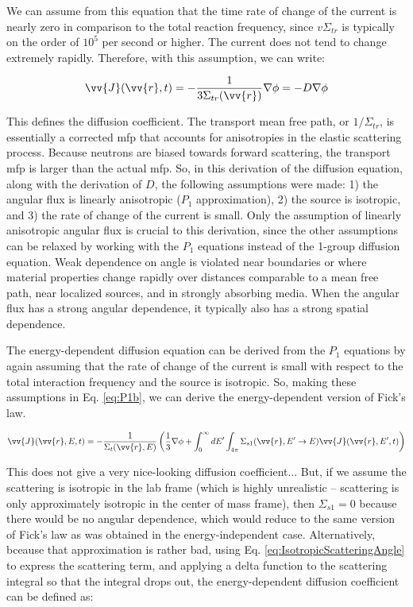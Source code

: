 \documentclass[10pt]{article}
\begin{document}
\begin{flushleft}
We can assume from this equation that the time rate of change of the current is nearly zero in comparison to the total reaction frequency, since \(v\Sigma_{tr}\) is typically on the order of \(10^5\) per second or higher. The current does not tend to change extremely rapidly. Therefore, with this assumption, we can write:

\begin{equation}
\label{eq:P1b_CurrentApproximation_2}
\vv{J}(\vv{r},t) =  - \frac{1}{3\Sigma_{tr}(\vv{r})}\nabla\phi = -D\nabla\phi
\end{equation}

This defines the diffusion coefficient. The transport mean free path, or \(1/\Sigma_{tr}\), is essentially a corrected mfp that accounts for anisotropies in the elastic scattering process.  Because neutrons are biased towards forward scattering, the transport mfp is larger than the actual mfp. So, in this derivation of the diffusion equation, along with the derivation of \(D\), the following assumptions were made: 1) the angular flux is linearly anisotropic (\(P_1\) approximation), 2) the source is isotropic, and 3) the rate of change of the current is small. Only the assumption of linearly anisotropic angular flux is crucial to this derivation, since the other assumptions can be relaxed by working with the \(P_1\) equations instead of the 1-group diffusion equation. Weak dependence on angle is violated near boundaries or where material properties change rapidly over distances comparable to a mean free path, near localized sources, and in strongly absorbing media. When the angular flux has a strong angular dependence, it typically also has a strong spatial dependence. 

The energy-dependent diffusion equation can be derived from the \(P_1\) equations by again assuming that the rate of change of the current is small with respect to the total interaction frequency and the source is isotropic. So, making these assumptions in Eq. \ref{eq:P1b}, we can derive the energy-dependent version of Fick's law. 

\begin{equation}
\label{eq:P1b_energyDepdendent}
\vv{J}(\vv{r}, E, t) = - \frac{1}{\Sigma_t(\vv{r},E)}\left(\frac{1}{3}\nabla\phi + \int_{0}^{\infty}dE' \int_{4\pi}^{ } \Sigma_{s1}(\vv{r}, E'\rightarrow E)\vv{J}(\vv{r}, E', t)\right)
\end{equation}

This does not give a very nice-looking diffusion coefficient... But, if we assume the scattering is isotropic in the lab frame (which is highly unrealistic – scattering is only approximately isotropic in the center of mass frame), then \(\Sigma_{s1}=0\) because there would be no angular dependence, which would reduce to the same version of Fick’s law as was obtained in the energy-independent case. Alternatively, bceause that approximation is rather bad, using Eq. \ref{eq:IsotropicScatteringAngle} to express the scattering term, and applying a delta function to the scattering integral so that the integral drops out, the energy-dependent diffusion coefficient can be defined as:


\end{flushleft}
\end{document}
